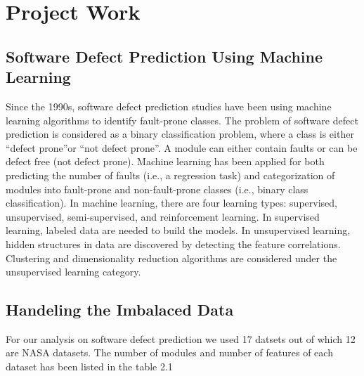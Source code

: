 \chapter{Project Work}\label{final}

\section{Software Defect Prediction Using Machine Learning}
Since the 1990s, software defect prediction studies
have been using machine learning algorithms to identify fault-prone classes. The problem of software defect prediction is considered as a binary classification problem, where a class is either “defect prone”or “not defect prone”. A module can either contain faults or can be defect free (not defect prone). 
Machine learning has been applied for both
predicting the number of faults (i.e., a regression task) and categorization of modules
into fault-prone and non-fault-prone classes (i.e., binary class classification). In machine
learning, there are four learning types: supervised, unsupervised, semi-supervised, and
reinforcement learning. In supervised learning, labeled data are needed to build the models.
In unsupervised learning, hidden structures in data are discovered by detecting the feature
correlations. Clustering and dimensionality reduction algorithms are considered under
the unsupervised learning category.

\pagebreak

\section{Handeling the Imbalaced Data}
For our analysis on software defect prediction we used 17 datsets out of which 12 are NASA datasets. The number of modules and number of features of each dataset has been listed in the table 2.1 

